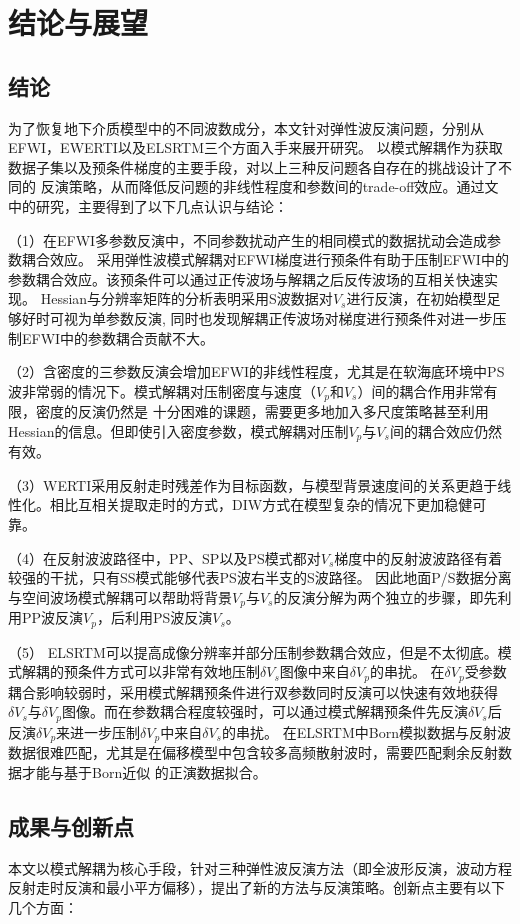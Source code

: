 \chapter{结论与展望}
\section{结论}
为了恢复地下介质模型中的不同波数成分，本文针对弹性波反演问题，分别从EFWI，EWERTI以及ELSRTM三个方面入手来展开研究。
以模式解耦作为获取数据子集以及预条件梯度的主要手段，对以上三种反问题各自存在的挑战设计了不同的
反演策略，从而降低反问题的非线性程度和参数间的trade-off效应。通过文中的研究，主要得到了以下几点认识与结论：

（1）在EFWI多参数反演中，不同参数扰动产生的相同模式的数据扰动会造成参数耦合效应。
采用弹性波模式解耦对EFWI梯度进行预条件有助于压制EFWI中的参数耦合效应。该预条件可以通过正传波场与解耦之后反传波场的互相关快速实现。
Hessian与分辨率矩阵的分析表明采用S波数据对$V_s$进行反演，在初始模型足够好时可视为单参数反演,
同时也发现解耦正传波场对梯度进行预条件对进一步压制EFWI中的参数耦合贡献不大。

（2）含密度的三参数反演会增加EFWI的非线性程度，尤其是在软海底环境中PS波非常弱的情况下。模式解耦对压制密度与速度（$V_p$和$V_s$）间的耦合作用非常有限，密度的反演仍然是
十分困难的课题，需要更多地加入多尺度策略甚至利用Hessian的信息。但即使引入密度参数，模式解耦对压制$V_p$与$V_s$间的耦合效应仍然有效。

（3）WERTI采用反射走时残差作为目标函数，与模型背景速度间的关系更趋于线性化。相比互相关提取走时的方式，DIW方式在模型复杂的情况下更加稳健可靠。

（4）在反射波波路径中，PP、SP以及PS模式都对$V_s$梯度中的反射波波路径有着较强的干扰，只有SS模式能够代表PS波右半支的S波路径。
因此地面P/S数据分离与空间波场模式解耦可以帮助将背景$V_p$与$V_s$的反演分解为两个独立的步骤，即先利用PP波反演$V_p$，后利用PS波反演$V_s$。

（5）
ELSRTM可以提高成像分辨率并部分压制参数耦合效应，但是不太彻底。模式解耦的预条件方式可以非常有效地压制$\delta
V_s$图像中来自$\delta V_p$的串扰。
在$\delta V_p$受参数耦合影响较弱时，采用模式解耦预条件进行双参数同时反演可以快速有效地获得$\delta
V_s$与$\delta V_p$图像。而在参数耦合程度较强时，可以通过模式解耦预条件先反演$\delta V_s$后反演$\delta
V_p$来进一步压制$\delta V_p$中来自$\delta V_s$的串扰。
在ELSRTM中Born模拟数据与反射波数据很难匹配，尤其是在偏移模型中包含较多高频散射波时，需要匹配剩余反射数据才能与基于Born近似
的正演数据拟合。
\section{成果与创新点}
本文以模式解耦为核心手段，针对三种弹性波反演方法（即全波形反演，波动方程反射走时反演和最小平方偏移），提出了新的方法与反演策略。创新点主要有以下几个方面：

